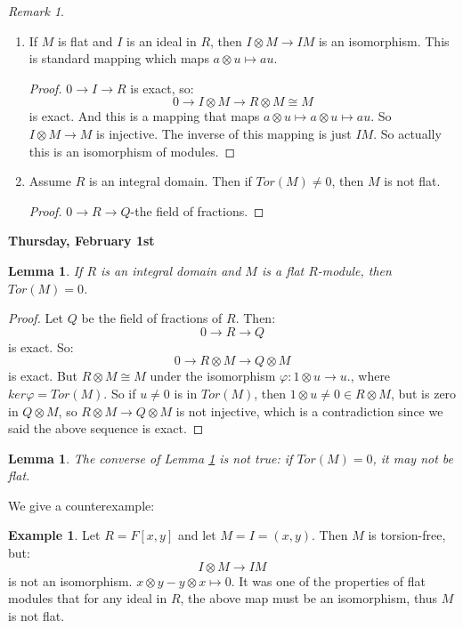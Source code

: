 \documentclass[9pt,reqno,twoside]{amsbook}
\theoremstyle{plain}
\numberwithin{section}{chapter}
\numberwithin{equation}{chapter}
\newtheorem{lem}[theorem]{Lemma}
\theoremstyle{definition}
\newtheorem{Ex}[theorem]{Example}
\theoremstyle{remark}
\newtheorem{rem}[theorem]{Remark}
\theoremstyle{plain}
\newcommand{\tens}{\otimes}
\renewcommand{\phi}{\varphi}
\begin{document}
\begin{rem}
\begin{enumerate}
\begin{proof}
\end{proof}

\item If $M$ is flat and $I$ is an ideal in $R$, then $I \tens M \to IM$ is an isomorphism. This is standard mapping which maps $a \tens u \mapsto au$. 

\begin{proof}
$0 \to I \to R$ is exact, so:
$$
0 \to I \tens M \to R \tens M \cong M
$$
 is exact. And this is a mapping that maps $a \tens u \mapsto a \tens u \mapsto au$. So $I \tens M \to M$ is injective. The inverse of this mapping is just $IM$. So actually this is an isomorphism of modules. 
\end{proof}

\item Assume $R$ is an integral domain. Then if $Tor(M) \neq 0$, then $M$ is not flat. 

\begin{proof}
$0 \to R \to Q$-the field of fractions. 
\end{proof}

\end{enumerate}

\end{rem}

\textbf{Thursday, February 1st}

\begin{lem}\label{lem10.148}
If $R$ is an integral domain and $M$ is a flat $R$-module, then $Tor(M) = 0$. 
\end{lem}

\begin{proof}
Let $Q$ be the field of fractions of $R$. Then:
$$
0 \to R \to Q
$$
 is exact. So:
$$
0 \to R \tens M \to Q \tens M
$$
 is exact. But $R \tens M \cong M$ under the isomorphism $\phi:1 \tens u \to u$., where $ker\phi = Tor(M)$. So if $u \neq 0$ is in $Tor(M)$, then $1 \tens u \neq 0 \in R \tens M$, but is zero in $Q \tens M$, so $R \tens M \to Q \tens M$ is not injective, which is a contradiction since we said the above sequence is exact. 
\end{proof}

\begin{lem}
The converse of Lemma \ref{lem10.148} is not true: if $Tor(M) = 0$, it may not be flat. 
\end{lem}
We give a counterexample:
\begin{Ex}
Let $R = F[x,y]$ and let $M = I = (x,y)$. Then $M$ is torsion-free, but:
$$
I \tens M \to IM
$$ 
is not an isomorphism. $x \tens y - y \tens x \mapsto 0$. It was one of the properties of flat modules that for any ideal in $R$, the above map must be an isomorphism, thus $M$ is not flat. 
\end{Ex}
\end{document}
